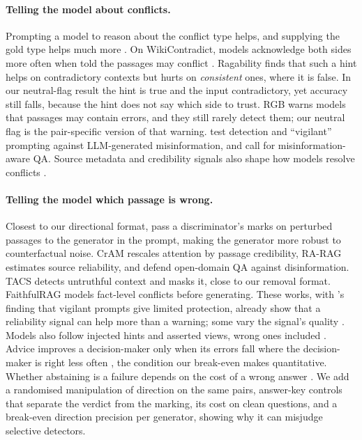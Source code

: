\paragraph{Telling the model about conflicts.}
Prompting a model to reason about the conflict type helps, and supplying the gold type helps much more
\citep{cattan2025conflicts}. On WikiContradict, models acknowledge both sides more often when told the passages may
conflict \citep{hou2024wikicontradict}. Ragability \citep{gross2026ragability} finds that such a hint helps on
contradictory contexts but hurts on \emph{consistent} ones, where it is false. In our neutral-flag result the hint is
true and the input contradictory, yet accuracy still falls, because the hint does not say which side to trust.
RGB \citep{chen2024rgb} warns models that passages may contain errors, and they still rarely
detect them; our neutral flag is the pair-specific version of that warning.
\citet{pan2023risk} test detection and ``vigilant'' prompting against LLM-generated misinformation, and
\citet{pan2023attacking} call for misinformation-aware QA. Source metadata and credibility signals also shape how models resolve conflicts
\citep{chiang2024metadata,ge2025confact}.

\paragraph{Telling the model which passage is wrong.}
Closest to our directional format, \citet{hong2024gullible} pass a discriminator's marks on perturbed passages to the
generator in the prompt, making the generator more robust to counterfactual noise. CrAM \citep{deng2025cram} rescales
attention by passage credibility, RA-RAG \citep{hwang2025rarag} estimates source reliability, and
\citet{weller2024defending} defend open-domain QA against disinformation. TACS \citep{yu2024tacs} detects untruthful context and masks it,
close to our removal format. FaithfulRAG \citep{zhang2025faithfulrag} models
fact-level conflicts before generating. These works, with \citet{pan2023risk}'s finding that vigilant
prompts give limited protection, already show that a reliability signal can help more than a warning; some vary
the signal's quality \citep{hong2024gullible,pan2024credibility}. Models also follow injected hints and asserted views, wrong
ones included \citep{turpin2023unfaithful,sharma2024sycophancy}. Advice improves a decision-maker only when its
errors fall where the decision-maker is right less often \citep{bansal2021accurate,mozannar2020defer}, the
condition our break-even makes quantitative. Whether
abstaining is a failure depends on the cost of a wrong answer \citep{wen2025abstention,song2025trustscore}.
We add a randomised manipulation of direction on the same pairs, answer-key controls that separate the verdict
from the marking, its cost on clean questions, and a break-even direction precision per generator,
showing why it can misjudge selective detectors.

